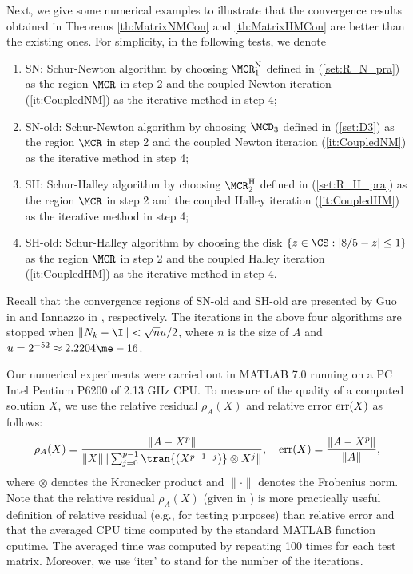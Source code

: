 Next, we give some numerical examples to illustrate that the
convergence results obtained in Theorems \ref{th:MatrixNMCon} and
\ref{th:MatrixHMCon} are better than the existing ones. For
simplicity, in the following tests, we denote

\begin{enumerate}
\item
SN: Schur-Newton algorithm by choosing $\MCR_1^{\text{N}}$ defined
in (\ref{set:R_N_pra}) as the region $\MCR$ in step 2 and the
coupled Newton iteration (\ref{it:CoupledNM}) as the iterative
method in step 4;
\item
SN-old: Schur-Newton algorithm by choosing $\MCD_3$ defined in
(\ref{set:D3}) as the region $\MCR$ in step 2 and the coupled Newton
iteration (\ref{it:CoupledNM}) as the iterative method in step 4;
\item
SH: Schur-Halley algorithm by choosing $\MCR_2^{\text{H}}$ defined
in (\ref{set:R_H_pra}) as the region $\MCR$ in step 2 and the
coupled Halley iteration (\ref{it:CoupledHM}) as the iterative
method in step 4;
\item
SH-old: Schur-Halley algorithm by choosing the disk $\{z\in\CS:
|8/5-z|\leq1\}$ as the region $\MCR$ in step 2 and the coupled
Halley iteration (\ref{it:CoupledHM}) as the iterative method in
step 4.
\end{enumerate}
Recall that the convergence regions of SN-old and SH-old are
presented by Guo in \cite{Guo2010} and Iannazzo in
\cite{Iannazzo2008}, respectively. The iterations in the above four
algorithms are stopped when $\|N_k - \I\| < \sqrt{n}u/2$, where $n$
is the size of $A$ and $u = 2^{-52} \approx2.2204\me-16$.


Our numerical experiments were carried out in MATLAB 7.0 running on
a PC Intel Pentium P6200 of 2.13 GHz CPU. To measure of the quality
of a computed solution $X$, we use the relative residual $\rho_A(X)$
and relative error $\textup{err}(X)$ as follows:
\begin{equation}
\label{eq:RelResErr} \rho_A(X) = \frac{\|A - X^p\|}{\|X\| \|\sum_{j
= 0}^{p - 1} \tran{(X^{p - 1 - j})}\otimes X^j\|}, \ \ \
\textup{err}(X) = \frac{\|A - X^p\|}{\|A\|},
\end{equation}
where $\otimes$ denotes the Kronecker product and $\|\cdot\|$
denotes the Frobenius norm. Note that the relative residual
$\rho_A(X)$ (given in \cite{GuoHigham2006}) is more practically
useful definition of relative residual (e.g., for testing purposes)
than relative error and that the averaged CPU time computed by the
standard MATLAB function \textsf{cputime}. The averaged time was
computed by repeating 100 times for each test matrix. Moreover, we
use `iter' to stand for the number of the iterations.
